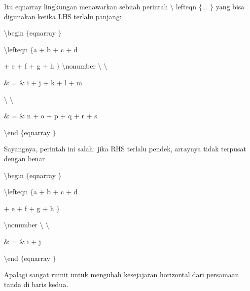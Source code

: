 \noindent 
Itu eqnarray lingkungan menawarkan sebuah perintah  $  \setminus  $ lefteqn  $  \{  $... $  \}  $ yang bisa digunakan ketika LHS terlalu panjang: \par
\noindent 
\vspace{16pt}
\noindent 
 $  \setminus  $begin $  \{  $eqnarray $  \}  $ \par
\vspace{12pt}
\noindent 
 $  \setminus  $lefteqn $  \{  $a + b + c + d \par
\vspace{12pt}
\noindent 
+ e + f + g + h $  \}  $ $  \setminus  $nonumber $  \setminus  $ $  \setminus  $ \par
\vspace{12pt}
\noindent 
 $  \&  $ =  $  \&  $ i + j + k + l + m \par
\vspace{12pt}
\noindent 
 $  \setminus  $ $  \setminus  $ \par
\vspace{12pt}
\noindent 
 $  \&  $ =  $  \&  $ n + o + p + q + r + s \par
\vspace{12pt}
\noindent 
 $  \setminus  $end $  \{  $eqnarray $  \}  $ \par
\noindent 
\vspace{16pt}
\noindent 
Sayangnya, perintah ini salah: jika RHS terlalu pendek, arraynya tidak terpusat dengan benar \par
\noindent 
\vspace{16pt}
\noindent 
 $  \setminus  $begin $  \{  $eqnarray $  \}  $ \par
\vspace{12pt}
\noindent 
 $  \setminus  $lefteqn $  \{  $a + b + c + d \par
\vspace{12pt}
\noindent 
+ e + f + g + h $  \}  $ \par
\vspace{12pt}
\noindent 
 $  \setminus  $nonumber $  \setminus  $ $  \setminus  $ \par
\vspace{12pt}
\noindent 
 $  \&  $ =  $  \&  $ i + j \par
\vspace{12pt}
\noindent 
 $  \setminus  $end $  \{  $eqnarray $  \}  $ \par
\vspace{12pt}
\noindent 
Apalagi sangat rumit untuk mengubah kesejajaran horizontal dari persamaan tanda di baris kedua.  \par

